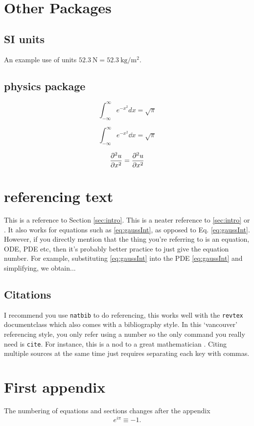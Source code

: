 \documentclass[%
 reprint,
 pre,
 amsmath,amssymb,
 aps,
]{revtex4-2}
\begin{document}
\section{Other Packages}


\subsection{SI units}

An example use of units $\SI{52.3}{\newton}=\SI{52.3}{\kg\per\meter\squared}$.

\subsection{physics package}

\begin{equation}
    \int_{-\infty}^\infty e^{-x^2} d x = \sqrt{\pi} \label{eq:gaussInt}
\end{equation}

\begin{equation}
    \int_{-\infty}^\infty e^{-x^2} \dd x = \sqrt{\pi}
\end{equation}

\begin{equation}
    \frac{\partial^2u}{\partial x^2} = \pdv[2]{u}{x} \label{eq:partialDiffExample}
\end{equation}

\section{referencing text}
\label{sec:ref}

This is a reference to Section \ref{sec:intro}. This is a neater reference to \cref{sec:intro} or .
It also works for equations such as \cref{eq:gaussInt}, as opposed to Eq. \eqref{eq:gaussInt}.
However, if you directly mention that the thing you're referring to is an equation, ODE, PDE etc, then it's probably better practice to just give the equation number. 
For example, substituting \cref{eq:gaussInt} into the PDE \eqref{eq:gaussInt} and simplifying, we obtain...

\subsection{Citations}

I recommend you use \texttt{natbib} to do referencing, this works well with the \texttt{revtex} documentclass which also comes with a bibliography style. 
In this `vancouver' referencing style, you only refer using a number so the only command you really need is \texttt{cite}. For instance, this is a nod to a great mathematician \cite{turing1990chemical}. 
Citing multiple sources at the same time just requires separating each key with commas.



\appendix

\section{First appendix}
The numbering of equations and sections changes after the appendix
\begin{equation}
    e^{i\pi}\equiv-1.
\end{equation}
\end{document}
